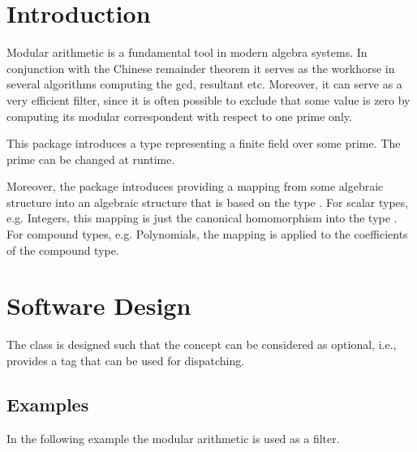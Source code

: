 \cleardoublepage
{}



\section{Introduction}

Modular arithmetic is a fundamental tool in modern algebra systems. In conjunction with the Chinese remainder theorem it serves as the workhorse in several algorithms computing the gcd, resultant etc. Moreover, it can serve as a very efficient filter, since it is often possible to exclude that some value is zero by computing its modular correspondent with respect to one prime only. 

This package introduces a type 
representing a finite field over some prime. 
The prime can be changed at runtime. 

Moreover, the package introduces  
providing a mapping from some algebraic structure  into an algebraic 
structure that is based on the type .  
For scalar types, e.g. Integers, this mapping is just the canonical homomorphism
into the type . 
For compound types, e.g. Polynomials, the mapping is applied to the 
coefficients of the compound type. 


\section{Software Design}

The class  is designed such that the concept 
 can be considered as optional, i.e., 
 provides a tag that can be used for dispatching. 

\subsection{Examples}

In the following example the modular arithmetic is used as a filter. 

